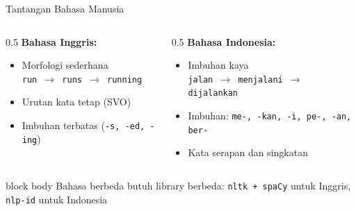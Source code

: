 \documentclass[aspectratio=169,t]{beamer}
\begin{document}
\begin{frame}{Tantangan Bahasa Manusia}
  \begin{columns}[T]
    \begin{column}{0.5\textwidth}
      \textcolor{nvblue}{\textbf{Bahasa Inggris:}}\\
      \begin{itemize}
        \footnotesize
        \item Morfologi sederhana\\
              \texttt{run $\to$ runs $\to$ running}
        \item Urutan kata tetap (SVO)
        \item Imbuhan terbatas (\texttt{-s, -ed, -ing})
      \end{itemize}
    \end{column}
    \begin{column}{0.5\textwidth}
      \textcolor{nvorange}{\textbf{Bahasa Indonesia:}}\\
      \begin{itemize}
        \footnotesize
        \item Imbuhan kaya\\
              \texttt{jalan $\to$ menjalani $\to$ dijalankan}
        \item Imbuhan: \texttt{me-, -kan, -i, pe-, -an, ber-}
        \item Kata serapan dan singkatan
      \end{itemize}
    \end{column}
  \end{columns}
  \vspace{1em}
  \begin{beamercolorbox}[rounded=true,shadow=false,sep=6pt]{block body}
    \centering
    \small\color{nvlightgreen}
    Bahasa berbeda butuh library berbeda: \texttt{nltk + spaCy} untuk Inggris,
    \texttt{nlp-id} untuk Indonesia
  \end{beamercolorbox}
\end{frame}
\end{document}
